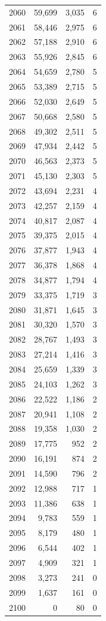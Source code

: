 \documentclass[11pt]{article}
\begin{document}
\begin{longtable}{@{}lrrr@{}}
2060 & 59,699 & 3,035 & 6\\
2061 & 58,446 & 2,975 & 6\\
2062 & 57,188 & 2,910 & 6\\
2063 & 55,926 & 2,845 & 6\\
2064 & 54,659 & 2,780 & 5\\
2065 & 53,389 & 2,715 & 5\\
2066 & 52,030 & 2,649 & 5\\
2067 & 50,668 & 2,580 & 5\\
2068 & 49,302 & 2,511 & 5\\
2069 & 47,934 & 2,442 & 5\\
2070 & 46,563 & 2,373 & 5\\
2071 & 45,130 & 2,303 & 5\\
2072 & 43,694 & 2,231 & 4\\
2073 & 42,257 & 2,159 & 4\\
2074 & 40,817 & 2,087 & 4\\
2075 & 39,375 & 2,015 & 4\\
2076 & 37,877 & 1,943 & 4\\
2077 & 36,378 & 1,868 & 4\\
2078 & 34,877 & 1,794 & 4\\
2079 & 33,375 & 1,719 & 3\\
2080 & 31,871 & 1,645 & 3\\
2081 & 30,320 & 1,570 & 3\\
2082 & 28,767 & 1,493 & 3\\
2083 & 27,214 & 1,416 & 3\\
2084 & 25,659 & 1,339 & 3\\
2085 & 24,103 & 1,262 & 3\\
2086 & 22,522 & 1,186 & 2\\
2087 & 20,941 & 1,108 & 2\\
2088 & 19,358 & 1,030 & 2\\
2089 & 17,775 & 952 & 2\\
2090 & 16,191 & 874 & 2\\
2091 & 14,590 & 796 & 2\\
2092 & 12,988 & 717 & 1\\
2093 & 11,386 & 638 & 1\\
2094 & 9,783 & 559 & 1\\
2095 & 8,179 & 480 & 1\\
2096 & 6,544 & 402 & 1\\
2097 & 4,909 & 321 & 1\\
2098 & 3,273 & 241 & 0\\
2099 & 1,637 & 161 & 0\\
2100 & 0 & 80 & 0\\
\end{longtable}
\end{document}
